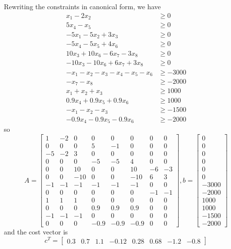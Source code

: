 \documentclass{article}
\begin{document}
\begin{enumerate}
\begin{soln}
			Rewriting the constraints in canonical form, we have
			\begin{align*}
				x_1-2x_2 &\ge 0 \\
				5x_4-x_5 &\ge 0 \\
				-5x_1-5x_2+3x_3 &\ge 0 \\
				-5x_4-5x_5+4x_6 &\ge 0 \\
				10x_3+10x_6-6x_7-3x_8 &\ge 0 \\
				-10x_3-10x_6+6x_7+3x_8 &\ge 0 \\
				-x_1-x_2-x_3-x_4-x_5-x_6 &\ge -3000 \\
				-x_7-x_8 &\ge -2000 \\
				x_1+x_2+x_3 &\ge 1000 \\
				0.9x_4+0.9x_5+0.9x_6 &\ge 1000 \\
				-x_1-x_2-x_3 &\ge -1500 \\
				-0.9x_4-0.9x_5-0.9x_6 &\ge -2000
			\end{align*}
			so \[A=\begin{bmatrix}
					1 & -2 & 0 & 0 & 0 & 0 & 0 & 0 \\
					0 & 0 & 0 & 5 & -1 & 0 & 0 & 0 \\
					-5 & -2 & 3 & 0 & 0 & 0 & 0 & 0 \\
					0 & 0 & 0 & -5 & -5 & 4 & 0 & 0 \\
					0 & 0 & 10 & 0 & 0 & 10 & -6 & -3 \\	
					0 & 0 & -10 & 0 & 0 & -10 & 6 & 3 \\
					-1 & -1 & -1 & -1 & -1 & -1 & 0 & 0 \\
					0 & 0 & 0 & 0 & 0 & 0 & -1 & -1 \\
					1 & 1 & 1 & 0 & 0 & 0 & 0 & 0 \\
					0 & 0 & 0 & 0.9 & 0.9 & 0.9 & 0 & 0 \\
					-1 & -1 & -1 & 0 & 0 & 0 & 0 & 0 \\
					0 & 0 & 0 & -0.9 & -0.9 & -0.9 & 0 & 0
			\end{bmatrix}, b=\begin{bmatrix}
					0 \\ 0 \\ 0 \\ 0 \\ 0 \\ 0 \\ -3000 \\ -2000 \\ 1000 \\ 1000 \\ -1500 \\ -2000
			\end{bmatrix}\] and the cost vector is \[c^T = \begin{bmatrix}
					0.3 & 0.7 & 1.1 & -0.12 & 0.28 & 0.68 & -1.2 & -0.8
			\end{bmatrix}\]
		\end{soln}

\end{enumerate}
\end{document}
